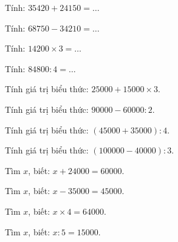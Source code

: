 \begin{ex}
Tính: $35420 + 24150 = \dots$
\end{ex}

\begin{ex}
Tính: $68750 - 34210 = \dots$
\end{ex}

\begin{ex}
Tính: $14200 \times 3 = \dots$
\end{ex}

\begin{ex}
Tính: $84800 : 4 = \dots$
\end{ex}

\begin{ex}
Tính giá trị biểu thức: $25000 + 15000 \times 3$.
\end{ex}

\begin{ex}
Tính giá trị biểu thức: $90000 - 60000 : 2$.
\end{ex}

\begin{ex}
Tính giá trị biểu thức: $(45000 + 35000) : 4$.
\end{ex}

\begin{ex}
Tính giá trị biểu thức: $(100000 - 40000) : 3$.
\end{ex}

\begin{ex}
Tìm $x$, biết: $x + 24000 = 60000$.
\end{ex}

\begin{ex}
Tìm $x$, biết: $x - 35000 = 45000$.
\end{ex}

\begin{ex}
Tìm $x$, biết: $x \times 4 = 64000$.
\end{ex}

\begin{ex}
Tìm $x$, biết: $x : 5 = 15000$.
\end{ex}

